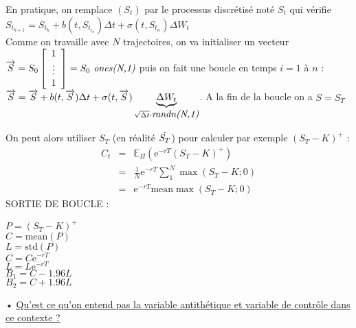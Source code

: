 \documentclass{report}
\newcommand{\E}{\mathbb{E}}
\newcommand{\e}{\mbox{e}}
\begin{document}
\vspace{0.2cm}
En pratique, on remplace $(S_t)$ par le processus discrétisé noté $S_t$ qui vérifie $S_{t_{k+1}} = S_{t_{k}} + b(t,S_t_{t_n})\Delta t + \sigma (t, S_{t_n}) \Delta W_t$\\
Comme on travaille avec $N$ trajectoires, on va initialiser un vecteur $\overrightarrow{S} = S_0\left[\begin{array}{c}1\\ \vdots\\1 \end{array}\right] = S_0\mbox{\textit{ ones(N,1)}}$ puis on fait une boucle en temps $i=1$ à $n$ : $\overrightarrow{S} = \overrightarrow{S} + b(t,\overrightarrow{S})\Delta t +\sigma (t,\overrightarrow{S})\underbrace{\Delta W_t}_{\sqrt{\Delta t}\cdot \mbox{\textit{randn(N,1)}}}$. A la fin de la boucle on a $S=S_T$

\vspace{0.2cm}
On peut alors utiliser $S_T$ (en réalité $ \Check{S_T}$) pour calculer par exemple $(S_T-K)^+$ : 
\begin{eqnarray}
C_t &=& \E_\Pi\left( \e^{-rT}(S_T-K)^+\right)\nonumber\\
&=& \displaystyle\frac{1}{N}\e^{-rT}\displaystyle\sum^N_1\max(S_T-K;0)\nonumber\\
&=&\e^{-rT}\mbox{mean}\max(S_T-K;0)\nonumber
\end{eqnarray}
SORTIE DE BOUCLE :
\begin{multicols}{3}
$P=(S_T-K)^+$\\
$C = \mbox{mean}(P)$\\
$L = \mbox{std}(P)$\\
$C = C\e^{-rT}$\\
$L = L\e^{-rT}$\\
$B_1 = C-1.96L$\\
$B_2 = C+1.96L$
\end{multicols}


• \underline{Qu'est ce qu'on entend pas la variable antithétique et variable de contrôle dans ce contexte ? }
\end{document}

